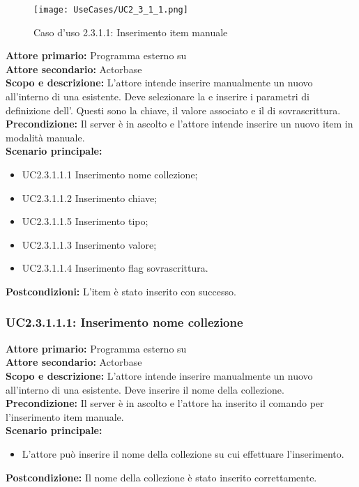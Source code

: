 \documentclass{scalatekids-article}
\begin{document}
\begin{figure}[H]
  \begin{center}
    \texttt{[image: UseCases/UC2\_3\_1\_1.png]}
    \caption*{Caso d'uso 2.3.1.1: Inserimento item manuale}
  \end{center}
\end{figure}
\textbf{Attore primario:} Programma esterno su \\
\textbf{Attore secondario:} Actorbase\\
\textbf{Scopo e descrizione:} L'attore intende inserire manualmente un nuovo  all'interno di una  esistente. Deve selezionare la  e inserire i parametri di definizione dell'. Questi sono la chiave, il valore associato e il  di sovrascrittura.\\
\textbf{Precondizione:} Il server è in ascolto e l'attore intende inserire un nuovo item in modalità manuale.\\
\textbf{Scenario principale:}
\begin{itemize}
\item UC2.3.1.1.1 Inserimento nome collezione;
\item UC2.3.1.1.2 Inserimento chiave;
\item UC2.3.1.1.5 Inserimento tipo;
\item UC2.3.1.1.3 Inserimento valore;
\item UC2.3.1.1.4 Inserimento flag sovrascrittura.
\end{itemize}
\textbf{Postcondizioni:} L'item è stato inserito con successo.

\subsubsection{UC2.3.1.1.1: Inserimento nome collezione}

\textbf{Attore primario:} Programma esterno su \\
\textbf{Attore secondario:} Actorbase\\
\textbf{Scopo e descrizione:} L'attore intende inserire manualmente un nuovo  all'interno di una  esistente. Deve inserire il nome della collezione.\\
\textbf{Precondizione:} Il server è in ascolto e l'attore ha inserito il comando per l'inserimento item manuale.\\
\textbf{Scenario principale:}
\begin{itemize}
\item L'attore può inserire il nome della collezione su cui effettuare l'inserimento.
\end{itemize}
\textbf{Postcondizione:} Il nome della collezione è stato inserito correttamente.
\end{document}
